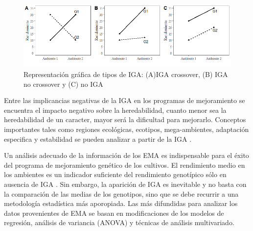 \begin{figure}[h]
\begin{center}
\includegraphics[width=14cm]{./Graficos/interac}
\end{center}
\caption{Representación gráfica de tipos de IGA: (A)IGA crossover, (B) IGA no crossover y (C) no IGA}
\label{fig:fig11}
\end{figure}


Entre las implicancias negativas de la IGA en los programas de mejoramiento se encuentra el impacto negativo sobre la heredabilidad, cuanto menor sea la heredabilidad de un caracter, mayor será la dificultad para mejorarlo. Conceptos importantes tales como regiones ecológicas, ecotipos, mega-ambientes, adaptación especifica y estabilidad se pueden analizar a partir de la IGA \citep{YanHunt2001}.

Un análisis adecuado de la información de los EMA es indispensable para el éxito del programa de mejoramiento genético de los cultivos. El rendimiento medio en los ambientes es un indicador suficiente del rendimiento genotípico sólo en ausencia de IGA \citep{YanKang2003}. Sin embargo, la aparición de IGA es inevitable y no basta con la comparación de las medias de los genotipos, sino que se debe recurrir a una metodología estadística más aporopiada. Las más difundidas para analizar los datos provenientes de EMA se basan en modificaciones de los modelos de regresión, análisis de variancia (ANOVA) y técnicas de análisis multivariado. 

